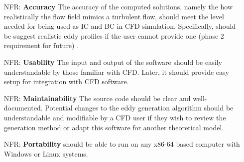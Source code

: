 \documentclass[12pt]{article}
\newcounter{nfrnum} %
\begin{document}
\noindent \begin{itemize}

\item[NFR\refstepcounter{nfrnum}\thenfrnum \label{NFR_Accuracy}:]
  \textbf{Accuracy} The accuracy of the computed solutions, namely the how realistically the flow field mimics a turbulent flow, should meet the level needed for being used as IC and BC in CFD simulation. Specifically, \progname{} should be suggest realistic eddy profiles if the user cannot provide one (phase 2 requirement for future) . 

\item[NFR\refstepcounter{nfrnum}\thenfrnum \label{NFR_Usability}:] \textbf{Usability} The input and output of the software should be easily understandable by those familiar with CFD. Later, it should provide easy setup for integration with CFD software.

\item[NFR\refstepcounter{nfrnum}\thenfrnum \label{NFR_Maintainability}:]
  \textbf{Maintainability} The source code should be clear and well-documented. Potential changes to the eddy generation algorithm should be understandable and modifiable by a CFD user if they wish to review the generation method or adapt this software for another theoretical model. 

\item[NFR\refstepcounter{nfrnum}\thenfrnum \label{NFR_Portability}:]
  \textbf{Portability} \progname{} should be able to run on any x86-64 based computer with Windows or Linux systems.


\end{itemize}
\end{document}
